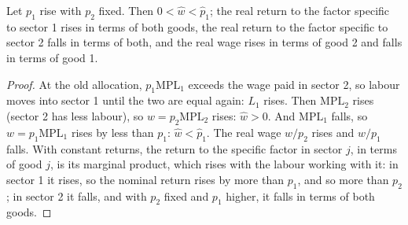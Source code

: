 \begin{omfigure}
\par{}
\end{omfigure}

\begin{proposition}\label{prop:b3:factor-endowments:specific}
Let $p_1$ rise with $p_2$ fixed. Then $0 < \hat w < \hat p_1$; the real return to the
factor specific to sector 1 rises in terms of both goods, the real return to the
factor specific to sector 2 falls in terms of both, and the real wage rises in
terms of good 2 and falls in terms of good 1.
\end{proposition}

\begin{proof}
At the old allocation, $p_1\mathrm{MPL}_1$ exceeds the wage paid in sector 2, so
labour moves into sector 1 until the two are equal again: $L_1$ rises. Then
$\mathrm{MPL}_2$ rises (sector 2 has less labour), so $w = p_2\mathrm{MPL}_2$ rises:
$\hat w > 0$. And $\mathrm{MPL}_1$ falls, so $w = p_1\mathrm{MPL}_1$ rises by less
than $p_1$: $\hat w < \hat p_1$. The real wage $w/p_2$ rises and $w/p_1$ falls. With
constant returns, the return to the specific factor in sector $j$, in terms of
good $j$, is its marginal product, which rises with the labour working with it:
in sector 1 it rises, so the nominal return rises by more than $p_1$, and so more
than $p_2$; in sector 2 it falls, and with $p_2$ fixed and $p_1$ higher, it falls in
terms of both goods.
\end{proof}

